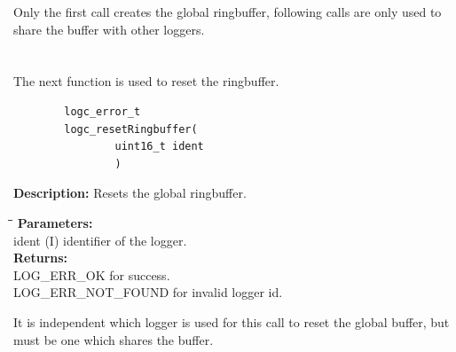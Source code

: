 \documentclass[a4paper, titlepage, 11pt]{article}
\begin{document}
Only the first call creates the global ringbuffer, following calls are only used
to share the buffer with other loggers. \\ \\ \\
The next function is used to reset the ringbuffer. \\

\small
\begin{verbatim}
        logc_error_t
        logc_resetRingbuffer(
                uint16_t ident
                )
\end{verbatim}
\normalsize
\textbf{Description:} Resets the global ringbuffer.
\begin{tabbing}
\hspace*{1cm}\=\hspace*{2cm}\=\hspace*{0,6cm}\= \kill
\textbf{Parameters:} \\
\> ident \> (I) identifier of the logger. \\
\textbf{Returns:} \\
\> LOG\_ERR\_OK for success. \\
\> LOG\_ERR\_NOT\_FOUND for invalid logger id. \\
\end{tabbing}
It is independent which logger is used for this call to reset the global buffer,
but must be one which shares the buffer.
\end{document}

